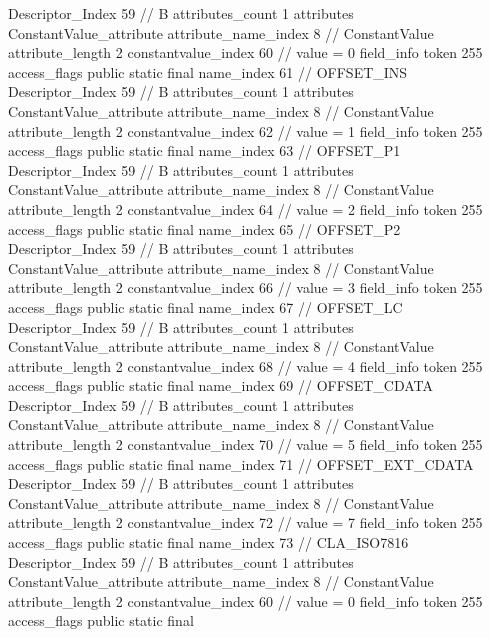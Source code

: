 {{{{{				Descriptor_Index	59		// B
				attributes_count	1
				attributes {
				ConstantValue_attribute {
					attribute_name_index	8		// ConstantValue
					attribute_length	2
					constantvalue_index	60		// value = 0
				}
				}
			}
			field_info {
				token	255
				access_flags	public static final
				name_index	61		// OFFSET_INS
				Descriptor_Index	59		// B
				attributes_count	1
				attributes {
				ConstantValue_attribute {
					attribute_name_index	8		// ConstantValue
					attribute_length	2
					constantvalue_index	62		// value = 1
				}
				}
			}
			field_info {
				token	255
				access_flags	public static final
				name_index	63		// OFFSET_P1
				Descriptor_Index	59		// B
				attributes_count	1
				attributes {
				ConstantValue_attribute {
					attribute_name_index	8		// ConstantValue
					attribute_length	2
					constantvalue_index	64		// value = 2
				}
				}
			}
			field_info {
				token	255
				access_flags	public static final
				name_index	65		// OFFSET_P2
				Descriptor_Index	59		// B
				attributes_count	1
				attributes {
				ConstantValue_attribute {
					attribute_name_index	8		// ConstantValue
					attribute_length	2
					constantvalue_index	66		// value = 3
				}
				}
			}
			field_info {
				token	255
				access_flags	public static final
				name_index	67		// OFFSET_LC
				Descriptor_Index	59		// B
				attributes_count	1
				attributes {
				ConstantValue_attribute {
					attribute_name_index	8		// ConstantValue
					attribute_length	2
					constantvalue_index	68		// value = 4
				}
				}
			}
			field_info {
				token	255
				access_flags	public static final
				name_index	69		// OFFSET_CDATA
				Descriptor_Index	59		// B
				attributes_count	1
				attributes {
				ConstantValue_attribute {
					attribute_name_index	8		// ConstantValue
					attribute_length	2
					constantvalue_index	70		// value = 5
				}
				}
			}
			field_info {
				token	255
				access_flags	public static final
				name_index	71		// OFFSET_EXT_CDATA
				Descriptor_Index	59		// B
				attributes_count	1
				attributes {
				ConstantValue_attribute {
					attribute_name_index	8		// ConstantValue
					attribute_length	2
					constantvalue_index	72		// value = 7
				}
				}
			}
			field_info {
				token	255
				access_flags	public static final
				name_index	73		// CLA_ISO7816
				Descriptor_Index	59		// B
				attributes_count	1
				attributes {
				ConstantValue_attribute {
					attribute_name_index	8		// ConstantValue
					attribute_length	2
					constantvalue_index	60		// value = 0
				}
				}
			}
			field_info {
				token	255
				access_flags	public static final
}}}}}
